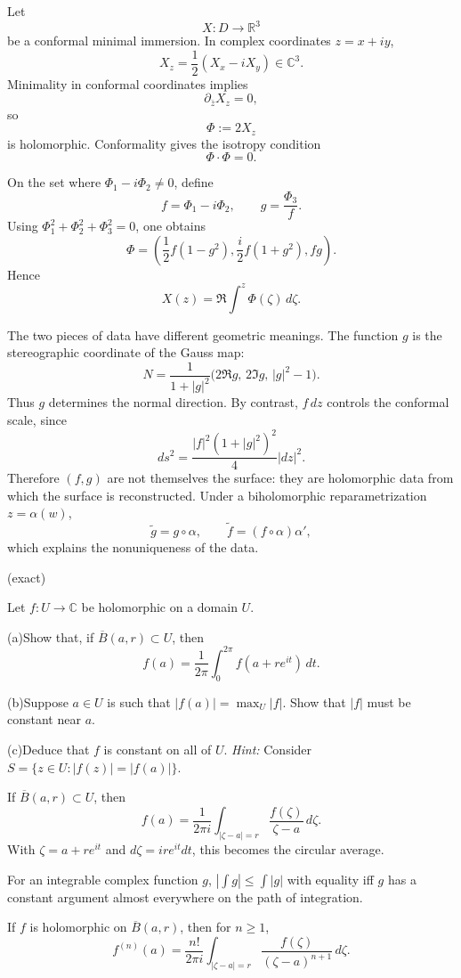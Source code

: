 \begin{solution}
Let
\[
X:D\longrightarrow\mathbb R^3
\]
be a conformal minimal immersion. In complex coordinates \(z=x+iy\),
\[
X_z=\frac12(X_x-iX_y)\in\mathbb C^3.
\]
Minimality in conformal coordinates implies
\[
\partial_{\bar z}X_z=0,
\]
so
\[
\Phi:=2X_z
\]
is holomorphic. Conformality gives the isotropy condition
\[
\Phi\cdot\Phi=0.
\]

On the set where \(\Phi_1-i\Phi_2\neq0\), define
\[
f=\Phi_1-i\Phi_2,
\qquad
g=\frac{\Phi_3}{f}.
\]
Using \(\Phi_1^2+\Phi_2^2+\Phi_3^2=0\), one obtains
\[
\Phi
=
\left(
\frac12f(1-g^2),
\frac{i}{2}f(1+g^2),
fg
\right).
\]
Hence
\[
X(z)=\Re\int^z\Phi(\zeta)\,d\zeta.
\]

The two pieces of data have different geometric meanings. The function \(g\) is the stereographic coordinate of the Gauss map:
\[
N
=
\frac{1}{1+|g|^2}
\bigl(2\Re g,\,2\Im g,\,|g|^2-1\bigr).
\]
Thus \(g\) determines the normal direction. By contrast, \(f\,dz\) controls the conformal scale, since
\[
ds^2
=
\frac{|f|^2(1+|g|^2)^2}{4}|dz|^2.
\]
Therefore \((f,g)\) are not themselves the surface: they are holomorphic data from which the surface is reconstructed. Under a biholomorphic reparametrization \(z=\alpha(w)\),
\[
\widetilde g=g\circ\alpha,
\qquad
\widetilde f=(f\circ\alpha)\alpha',
\]
which explains the nonuniqueness of the data.
\end{solution}


\begin{problem}[CP-IV-0090]
\label{prob:cp-iv-0090}
(exact)

Let $f:U\to\mathbb{C}$ be holomorphic on a domain $U$.

	\par\noindent (a)\quad Show that, if $\overline{B}(a,r)\subset U$, then
	\[
	f(a)=\frac{1}{2\pi}\int_{0}^{2\pi} f(a+re^{it})\,dt.
	\]
	\par\noindent (b)\quad Suppose $a\in U$ is such that $|f(a)|=\max_{U}|f|$. Show that $|f|$ must be constant near $a$.
	\par\noindent (c)\quad Deduce that $f$ is constant on all of $U$.
	\quad\emph{Hint:} Consider $S=\{z\in U: |f(z)|=|f(a)|\}$.

If $\overline{B}(a,r)\subset U$, then
\[
f(a)=\frac{1}{2\pi i}\int_{|\zeta-a|=r}\frac{f(\zeta)}{\zeta-a}\,d\zeta.
\]
With $\zeta=a+re^{it}$ and $d\zeta=ire^{it}dt$, this becomes the circular average.

For an integrable complex function $g$, $\left|\int g\right|\le\int|g|$ with equality iff $g$ has a constant argument almost everywhere on the path of integration.

If $f$ is holomorphic on $\overline{B}(a,r)$, then for $n\ge1$,
\[
f^{(n)}(a)=\frac{n!}{2\pi i}\int_{|\zeta-a|=r}\frac{f(\zeta)}{(\zeta-a)^{n+1}}\,d\zeta.
\]
\end{problem}

